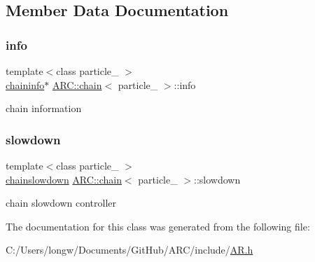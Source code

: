 \subsection{Member Data Documentation}
\hypertarget{classARC_1_1chain_a2b0336aa1235e52e0bb586ba4bcaa211}{}\label{classARC_1_1chain_a2b0336aa1235e52e0bb586ba4bcaa211} 
\subsubsection{\texorpdfstring{info}{info}}
{\footnotesize\ttfamily template$<$class particle\+\_\+ $>$ \\
\hyperlink{classARC_1_1chaininfo}{chaininfo}$\ast$ \hyperlink{classARC_1_1chain}{A\+R\+C\+::chain}$<$ particle\+\_\+ $>$\+::info}



chain information 

\hypertarget{classARC_1_1chain_a3a524e2f3dc8a0edd490307e7d3c1670}{}\label{classARC_1_1chain_a3a524e2f3dc8a0edd490307e7d3c1670} 
\subsubsection{\texorpdfstring{slowdown}{slowdown}}
{\footnotesize\ttfamily template$<$class particle\+\_\+ $>$ \\
\hyperlink{classARC_1_1chainslowdown}{chainslowdown} \hyperlink{classARC_1_1chain}{A\+R\+C\+::chain}$<$ particle\+\_\+ $>$\+::slowdown}



chain slowdown controller 



The documentation for this class was generated from the following file\+:\begin{DoxyCompactItemize}
\item 
C\+:/\+Users/longw/\+Documents/\+Git\+Hub/\+A\+R\+C/include/\hyperlink{AR_8h}{A\+R.\+h}\end{DoxyCompactItemize}
